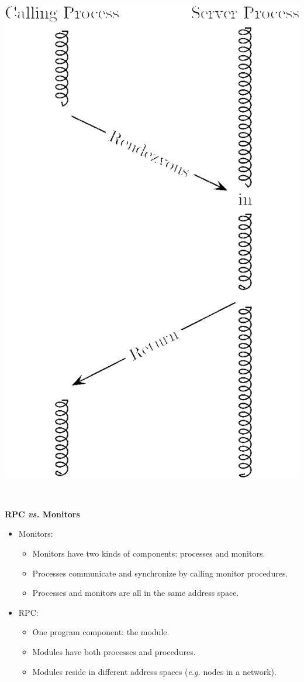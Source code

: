 \documentclass{article}
\newcommand{\nop}[1]{}
\newcommand{\myfig}[1]{\newpage\begin{overpic}[scale=1.5]{figures/#1}}
\newcommand{\myfigend}{\end{overpic}}
\newcommand{\bi}{\begin{itemize}}
\newcommand{\ii}{\item}
\newcommand{\ei}{\end{itemize}}
\newcommand{\ti}[1]{
\newpage
\mbox{~}

\vspace{1.25in}
\centerline{\bf #1}
}
\begin{document}
\includegraphics[scale=0.4]{figures/rendezvous.png}

\nop{
\myfig{timing_rpc_rend.pdf}
\myfigend
}

\ti{RPC {\em vs.} Monitors}
\bi
\ii Monitors:
\bi
\ii Monitors have two kinds of components:  processes and monitors.
\ii Processes communicate and synchronize by calling monitor procedures.
\ii Processes and monitors are all in the same address space.
\ei
\ii RPC:
\bi
\ii One program component: the module.
\ii Modules have both processes and procedures.
\ii Modules reside in different address spaces ({\em e.g.} nodes in a
network). 
\ei
\ei

\nop{
\myfig{modules.pdf}
\myfigend
}
\end{document}
